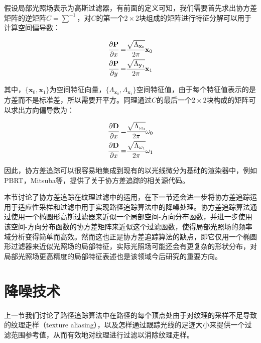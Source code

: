 假设局部光照场表示为高斯过滤器，有前面的定义可知，我们需要首先求出协方差矩阵的逆矩阵$C=\sum^{-1}$，对$C$的第一个$2\times 2$块组成的矩阵进行特征分解可以用于计算空间偏导数：

\begin{equation}
	\begin{aligned}
		 \cfrac{{\rm \partial}\mathbf{P}}{{\rm \partial} x}=& \cfrac{\sqrt{{\Lambda_{\mathbf{x}_0} }}}{2\pi}\mathbf{x}_0 \\
		 \cfrac{{\rm \partial}\mathbf{P}}{{\rm \partial} y}=& \cfrac{\sqrt{{\Lambda_{\mathbf{y}_1}}}}{2\pi}\mathbf{x}_1 \\
	\end{aligned}
\end{equation}

\noindent 其中，$\{\mathbf{x}_0,\mathbf{x}_1\}$为空间特征向量，$\{\Lambda_{\mathbf{x}_0},\Lambda_{\mathbf{x}_1}\}$空间特征值，由于每个特征值表示的是方差而不是标准差，所以需要开平方。同理通过$C$的最后一个$2\times 2$块构成的矩阵可以求出方向偏导数为：

\begin{equation}
	\begin{aligned}
		 \cfrac{{\rm \partial}\mathbf{D}}{{\rm \partial} x}=& \cfrac{\sqrt{{\Lambda_{\omega_0}}}}{2\pi}\omega_0 \\
		 \cfrac{{\rm \partial}\mathbf{D}}{{\rm \partial} x}=& \cfrac{\sqrt{{\Lambda_{\omega_1}}}}{2\pi}\omega_1 \\
	\end{aligned}
\end{equation}

\noindent 因此，协方差追踪可以很容易地集成到现有的以光线微分为基础的渲染器中，例如PBRT，Mitsuba等，\cite{a:Covariancetracingsourcecode}提供了关于协方差追踪的相关源代码。

本节讨论了协方差追踪在纹理过滤中的运用，在下一节还会进一步将协方差追踪运用于适应性采样和过滤中用于实现路径追踪算法中的降噪处理。协方差追踪算法通过使用一个椭圆形高斯过滤器来近似一个局部空间-方向分布函数，并进一步使用该空间-方向分布函数的协方差矩阵来近似这个过滤函数，使得局部光照场的频率域分析变得简单而高效。然而这也正是协方差追踪算法的缺点，即它仅用一个椭圆形过滤器来近似光照场的局部特征，实际光照场可能还会有更复杂的形状分布，对局部光照场更高精度的局部特征表述也是该领域今后研究的重要方向。







\section{降噪技术}\label{sec:pt-denoising}
上一节我们讨论了路径追踪算法中在路径的每个顶点处由于对纹理的采样不足导致的纹理走样（texture aliasing），以及怎样通过跟踪光线的足迹大小来提供一个过滤范围参考值，从而有效地对纹理进行过滤以消除纹理走样。

